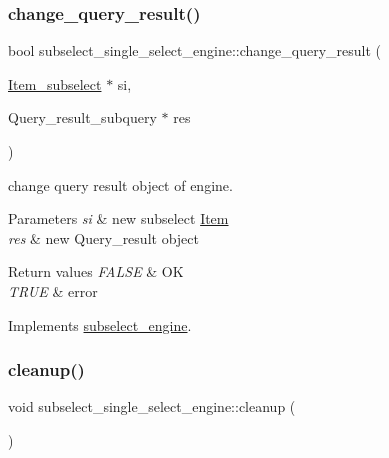 \subsubsection{\texorpdfstring{change\+\_\+query\+\_\+result()}{change\_query\_result()}}
{\footnotesize\ttfamily bool subselect\+\_\+single\+\_\+select\+\_\+engine\+::change\+\_\+query\+\_\+result (\begin{DoxyParamCaption}\item[{\mbox{\hyperlink{classItem__subselect}{Item\+\_\+subselect}} $\ast$}]{si,  }\item[{Query\+\_\+result\+\_\+subquery $\ast$}]{res }\end{DoxyParamCaption})\hspace{0.3cm}{\ttfamily [virtual]}}

change query result object of engine.


\begin{DoxyParams}{Parameters}
{\em si} & new subselect \mbox{\hyperlink{classItem}{Item}} \\
\hline
{\em res} & new Query\+\_\+result object\\
\hline
\end{DoxyParams}

\begin{DoxyRetVals}{Return values}
{\em F\+A\+L\+SE} & OK \\
\hline
{\em T\+R\+UE} & error \\
\hline
\end{DoxyRetVals}


Implements \mbox{\hyperlink{classsubselect__engine}{subselect\+\_\+engine}}.

\mbox{\label{classsubselect__single__select__engine_a971db624407ef715670e8652cf6bff06}} 
\subsubsection{\texorpdfstring{cleanup()}{cleanup()}}
{\footnotesize\ttfamily void subselect\+\_\+single\+\_\+select\+\_\+engine\+::cleanup (\begin{DoxyParamCaption}{ }\end{DoxyParamCaption})\hspace{0.3cm}{\ttfamily [virtual]}}


